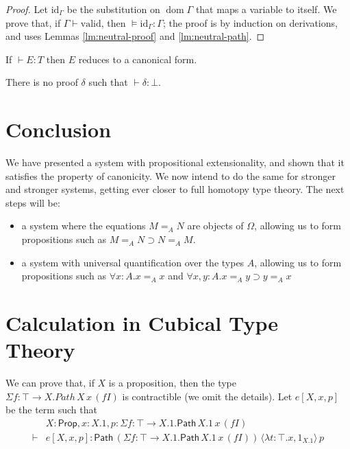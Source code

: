 \documentclass[a4paper,UKenglish]{lipics-v2016}
\newcommand*{\vald}{\ensuremath{\vdash \mathrm{valid}}}
\newcommand*{\dom}{\ensuremath{\operatorname{dom}}}
\newcommand{\Path}[3]{\ensuremath{\mathsf{Path} \, {#1} \, {#2} \, {#3}}}
\newcommand{\Prop}{\mathsf{Prop}}
\theoremstyle{plain}
\theoremstyle{definition}
\begin{document}
\begin{proof}
Let $\mathrm{id}_\Gamma$ be the substitution on $\dom \Gamma$ that maps a variable to itself.
We prove that, if $\Gamma \vald$, then $\models \mathrm{id}_\Gamma : \Gamma$; the proof is by induction on derivations, and uses Lemmas \ref{lm:neutral-proof} and \ref{lm:neutral-path}.
\end{proof}

\begin{corollary}[Canonicity]
If $\vdash E : T$ then $E$ reduces to a canonical form.
\end{corollary}

\begin{corollary}[Consistency]
There is no proof $\delta$ such that $\vdash \delta : \bot$.
\end{corollary}

\section{Conclusion}

We have presented a system with propositional extensionality, and shown that it satisfies the property of canonicity.
We now intend to do the same for stronger and stronger systems, getting
ever closer to full homotopy type theory.  The next steps will be:

\begin{itemize}
\item
a system where the equations $M =_A N$ are objects of $\Omega$, allowing us to form propositions such as $M =_A N \supset N =_A M$.
\item
a system with universal quantification over the types $A$, allowing us to form propositions such as $\forall x:A. x =_A x$ and
$\forall x,y : A. x =_A y \supset y =_A x$
\end{itemize}



\appendix

\section{Calculation in Cubical Type Theory}
\label{appendix:cubical}

\newcommand{\steptwo}{\mathsf{step}_2}
\newcommand{\stepthree}{\mathsf{step}_3}

We can prove that, if $X$ is a proposition, then the type $\Sigma f:\top \rightarrow X. Path \, X \, x \, (f I)$ is contractible (we omit the details).  Let $e[X, x, p]$ be the term such that
\begin{align*} & X : \Prop, x : X.1, p : \Sigma f:\top \rightarrow X.1. \Path{X.1}{x}{(fI)} \\
\vdash & e[X, x, p] : \Path{(\Sigma f:\top \rightarrow X.1. \Path{X.1}{x}{(f I)})}{\langle \lambda t : \top . x, 1_{X.1} \rangle}{p}
\end{align*}
\end{document}
